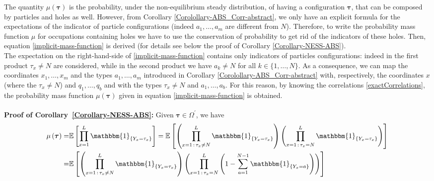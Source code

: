 \documentclass[10pt]{article}
\numberwithin{equation}{section}
\numberwithin{equation}{subsection}
\begin{document}
{\color{blue} The quantity $\mu(\bm{\tau})$ is the probability, under the non-equilibrium steady distribution, of having a configuration $\bm{\tau}$, that can be composed by particles and holes as well. However, from Corollary \ref{Corolollary-ABS_Corr-abstract}, we only have an explicit formula for the expectations of the indicator of particle configurations (indeed $a_{1},\ldots,a_{m}$ are different from $N$). Therefore, to write the probability mass function $\mu$ for occupations containing holes we have to use the conservation of probability to get rid of the indicators of these holes. Then, equation \eqref{implicit-mass-function} is derived (for details see below the proof of Corollary \ref{Corollary-NESS-ABS}).\\
 The expectation on the right-hand-side of \eqref{implicit-mass-function} contains only indicators of particles configurations: indeed in the first product  $\tau_{x}\neq N$ are considered, while in the second product we have $a_{k}\neq N$ for all $k\in\{1,\ldots,N\}$. As a consequence, we can map the coordinates $x_{1},\ldots,x_{m}$ and the types $a_{1},\ldots,a_{m}$ introduced in Corollary \ref{Corolollary-ABS_Corr-abstract} with, respectively, the coordinates $x$ (where the $\tau_{x}\neq N$) and $q_{1},\ldots,q_{b}$ and with the types $\tau_{x}\neq N$ and $a_{1},\ldots,a_{b}$. For this reason, by knowing the correlations \eqref{exactCorrelations}, the probability mass function $\mu(\bm{\tau})$ given in equation \eqref{implicit-mass-function} is obtained.}\\ \\
\textbf{Proof of Corollary~\ref{Corollary-NESS-ABS}:}
Given $\bm{\tau}\in \Omega^{'}$,  we have 
\begin{align}
	\mu\left(\bm{\tau}\right)=&\mathbb{E}\left[\prod_{x=1}^{L}\mathbbm{1}_{\{Y_{x}=\tau_{x}\}}\right]
	=\mathbb{E}\left[\left(\prod_{x=1\,:\,\tau_{x}\neq N}^{L}\mathbbm{1}_{\{Y_{x}=\tau_{x}\}}\right)\left(\prod_{x=1\,:\,\tau_{x}=N}^{L}\mathbbm{1}_{\{Y_{x}=\tau_x\}}\right)\right]\nonumber\\
	=&\mathbb{E}\left[\left(\prod_{x=1\,:\,\tau_{x}\neq N}^{L}\mathbbm{1}_{\{Y_{x}=\tau_{x}\}}\right)\left(\prod_{x=1\,:\,\tau_{x}=N}^{L}\left(1-\sum_{a=1}^{N-1}\mathbbm{1}_{\{Y_{x}=a\}}\right)\right)\right]
\end{align}
\end{document}
